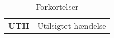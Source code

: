 \begin{table}[H]
\begin{tabular}{p{4.5cm} p{10.5cm}}
\textbf{UTH} 
& Utilsigtet hændelse \vspace{0.5cm} \\
\end{tabular}
\caption{Forkortelser}
\label{table:forkortelser}
\end{table}
